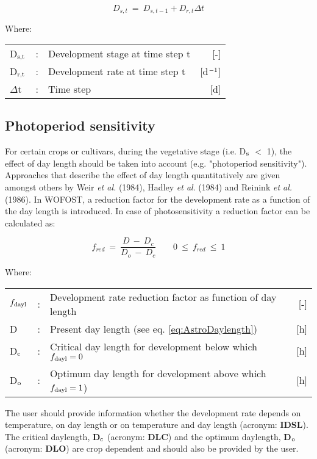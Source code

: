 \begin{equation}
\label{eq:5.4}
D_{s,t} ~=~ D_{s,t-1} + D_{r,t} \Delta t
\end{equation}

Where:\\[5pt]
\begin{tabularx}{\textwidth}{llXr}
	D$_{{\rm s,t}}$ &:& Development stage at time step t    &    [-]\\
	D$_{{\rm r,t}}$ &:& Development rate at time step t     &   [d$^{{\rm -1}}$]\\
	$\Delta$t &:& Time step   &     [d]\\
\end{tabularx}

\subsection{Photoperiod sensitivity}

For certain crops or cultivars, during the vegetative stage (i.e. D$_{{\rm s}}$ $<$ 1), the 
effect of day length should be taken into account (e.g. "photoperiod sensitivity"). 
Approaches that describe the effect of day length 
quantitatively are given amongst others by  Weir {\it et al.} (1984), Hadley {\it et al}. (1984) 
and Reinink {\it et al.} (1986). In WOFOST, a reduction factor for the development rate as a 
function of the day length is introduced. In case of photosensitivity  a reduction factor
can be calculated as:

\begin{equation}
\label{eq:5.5}
f_{red} ~=~{\frac{D ~-~D _{c} }{D _{o} ~-~ D _{c} }} ~~~~~~~~~0~\le ~f _{red} ~\le ~1
\end{equation}

Where:\\[5pt]
\begin{tabularx}{\textwidth}{llXr}
	$f_{{\rm dayl}}$ &:& Development rate reduction factor as function of day length   &     [-]\\
	D &:& Present day length (see eq. \ref{eq:AstroDaylength})   &     [h]\\
	D$_{{\rm c}}$ &:& Critical day length for development below which $f_{{\rm dayl}} = 0$  &    [h]\\
	D$_{{\rm o}}$ &:& Optimum day length for development above which $f_{{\rm dayl}} = 1$)    &    [h]\\
\end{tabularx}

The user should provide information whether the development rate depends on temperature, 
on day length or on temperature and day length (acronym: {\bf IDSL}). The critical
daylength, {\bf D$_{{\rm c}}$} (acronym: {\bf DLC}) and the optimum daylength, 
{\bf D$_{{\rm o}}$} (acronym: {\bf DLO}) are crop dependent and should also be provided by 
the user. 

